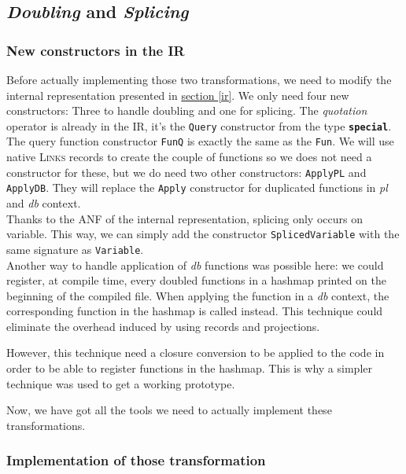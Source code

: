 \documentclass[11pt]{article}
\newcommand\mysc[1]{{\rmfamily\textsc{#1}}\xspace}
\newcommand\links{\mysc{Links}}
\newcommand\refsec[1]{\hyperref[#1]{section \ref*{#1}}}
\newcommand\sig[1]{{\tt\bf #1}}
\newcommand\effect[1]{{\em #1}}
\newcommand\ocamlc[1]{\lstinline[language={[Objective]Caml},basicstyle=\ttfamily\normalsize]{#1}}
\begin{document}
\subsection{\emph{Doubling} and \emph{Splicing}}

\subsubsection{New constructors in the IR}

Before actually implementing those two transformations, we need to modify the internal representation presented in \refsec{ir}. We only need four new constructors: Three to handle doubling and one for splicing. The \emph{quotation} operator is already in the IR, it's the \ocamlc{Query} constructor from the type \sig{special}.\\

The query function constructor \ocamlc{FunQ} is exactly the same as the \ocamlc{Fun}. We will use native \links records to create the couple of functions so we does not need a constructor for these, but we do need two other constructors: \ocamlc{ApplyPL} and \ocamlc{ApplyDB}. They will replace the \ocamlc{Apply} constructor for duplicated functions in \effect{pl} and \effect{db} context.\\

Thanks to the ANF of the internal representation, splicing only occurs on variable. This way, we can simply add the constructor \ocamlc{SplicedVariable} with the same signature as \ocamlc{Variable}.\\

Another way to handle application of \effect{db} functions was possible here: we could register, at compile time, every doubled functions in a hashmap printed on the beginning of the compiled file. When applying the function in a \effect{db} context, the corresponding function in the hashmap is called instead. This technique could eliminate the overhead induced by using records and projections.

However, this technique need a closure conversion to be applied to the code in order to be able to register functions in the hashmap. This is why a simpler technique was used to get a working prototype.

Now, we have got all the tools we need to actually implement these transformations.

\subsubsection{Implementation of those transformation}
\end{document}
